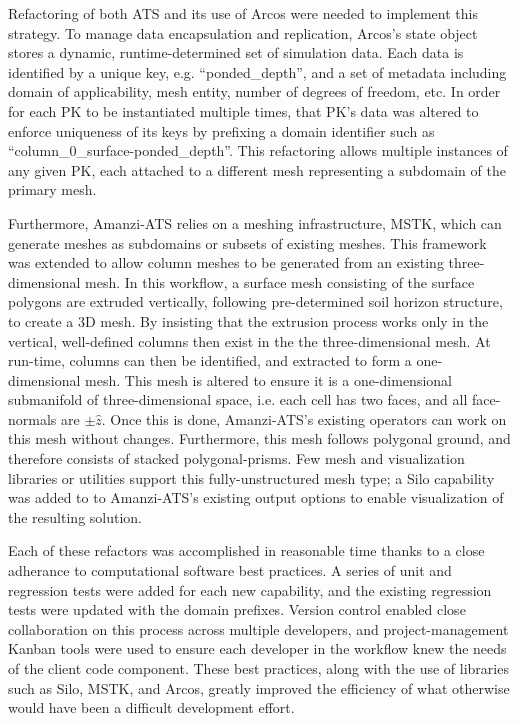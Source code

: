 \documentclass[review]{elsarticle}
\begin{document}
Refactoring of both ATS and its use of Arcos were needed to implement this strategy.
To manage data encapsulation and replication, Arcos's state object stores a dynamic, runtime-determined set of simulation data.
Each data is identified by a unique key, e.g. ``ponded\_depth'', and a set of metadata including domain of applicability, mesh entity, number of degrees of freedom, etc.
In order for each PK to be instantiated multiple times, that PK's data was altered to enforce uniqueness of its keys by prefixing a domain identifier such as ``column\_0\_surface-ponded\_depth''.
This refactoring allows multiple instances of any given PK, each attached to a different mesh representing a subdomain of the primary mesh.

Furthermore, Amanzi-ATS relies on a meshing infrastructure, MSTK, \cite{garimella-2014-mstk}  which can generate meshes as subdomains or subsets of existing meshes.
This framework was extended to allow column meshes to be generated from an existing three-dimensional mesh.
In this workflow, a surface mesh consisting of the surface polygons are extruded vertically, following pre-determined soil horizon structure, to create a 3D mesh.
By insisting that the extrusion process works only in the vertical, well-defined columns then exist in the the three-dimensional mesh.
At run-time, columns can then be identified, and extracted to form a one-dimensional mesh.
This mesh is altered to ensure it is a one-dimensional submanifold of three-dimensional space, i.e. each cell has two faces, and all face-normals are $\pm \hat{z}$.
Once this is done, Amanzi-ATS's existing operators can work on this mesh without changes.
Furthermore, this mesh follows polygonal ground, and therefore consists of stacked polygonal-prisms.
Few mesh and visualization libraries or utilities support this fully-unstructured mesh type; a Silo\cite{silo} capability was added to to Amanzi-ATS's existing output options to enable visualization of the resulting solution.

Each of these refactors was accomplished in reasonable time thanks to a close adherance to computational software best practices.
A series of unit and regression tests were added for each new capability, and the existing regression tests were updated with the domain prefixes.
Version control enabled close collaboration on this process across multiple developers, and project-management Kanban tools were used to ensure each developer in the workflow knew the needs of the client code component.
These best practices, along with the use of libraries such as Silo, MSTK, and Arcos, greatly improved the efficiency of what otherwise would have been a difficult development effort.
\end{document}
